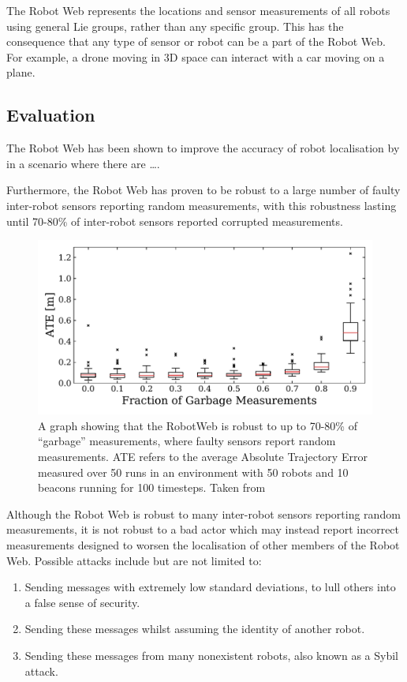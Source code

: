 The Robot Web represents the locations and sensor measurements of all robots using general Lie groups, rather than any specific group. This has the consequence that any type of sensor or robot can be a part of the Robot Web. For example, a drone moving in 3D space can interact with a car moving on a plane.

\subsection{Evaluation}
The Robot Web has been shown to improve the accuracy of robot localisation by  in a scenario where there are \dots. 

Furthermore, the Robot Web has proven to be robust to a large number of faulty inter-robot sensors reporting random measurements, with this robustness lasting until 70-80\% of inter-robot sensors reported corrupted measurements.

\begin{figure}[!h]
    \centering
    \includegraphics[page=1,width=.60\textwidth]{diagrams/sensor_noise.pdf}
    \caption[RobotWeb's robustness to garbage measurements]{A graph showing that the RobotWeb is robust to up to 70-80\% of ``garbage'' measurements, where faulty sensors report random measurements. ATE refers to the average Absolute Trajectory Error measured over 50 runs in an environment with 50 robots and 10 beacons running for 100 timesteps. Taken from \cite[Figure~5]{Robotweb}}
\end{figure}

Although the Robot Web is robust to many inter-robot sensors reporting random measurements, it is not robust to a bad actor which may instead report incorrect measurements designed to worsen the localisation of other members of the Robot Web. Possible attacks include but are not limited to:

\begin{enumerate}
    \item Sending messages with extremely low standard deviations, to lull others into a false sense of security.
    \item Sending these messages whilst assuming the identity of another robot.
    \item Sending these messages from many nonexistent robots, also known as a Sybil attack.
\end{enumerate}

